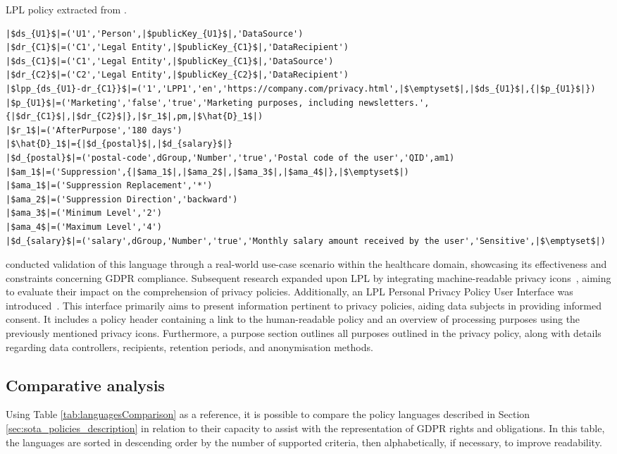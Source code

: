\begin{listing}[ht]
\caption{LPL policy extracted from \cite{gerl_lpl_2018}.}
\label{list:lpl_example}
\begin{verbatim}
|$ds_{U1}$|=('U1','Person',|$publicKey_{U1}$|,'DataSource')
|$dr_{C1}$|=('C1','Legal Entity',|$publicKey_{C1}$|,'DataRecipient')
|$ds_{C1}$|=('C1','Legal Entity',|$publicKey_{C1}$|,'DataSource')
|$dr_{C2}$|=('C2','Legal Entity',|$publicKey_{C2}$|,'DataRecipient')
|$lpp_{ds_{U1}-dr_{C1}}$|=('1','LPP1','en','https://company.com/privacy.html',|$\emptyset$|,|$ds_{U1}$|,{|$p_{U1}$|})
|$p_{U1}$|=('Marketing','false','true','Marketing purposes, including newsletters.',{|$dr_{C1}$|,|$dr_{C2}$|},|$r_1$|,pm,|$\hat{D}_1$|)
|$r_1$|=('AfterPurpose','180 days')
|$\hat{D}_1$|={|$d_{postal}$|,|$d_{salary}$|}
|$d_{postal}$|=('postal-code',dGroup,'Number','true','Postal code of the user','QID',am1)
|$am_1$|=('Suppression',{|$ama_1$|,|$ama_2$|,|$ama_3$|,|$ama_4$|},|$\emptyset$|)
|$ama_1$|=('Suppression Replacement','*')
|$ama_2$|=('Suppression Direction','backward')
|$ama_3$|=('Minimum Level','2')
|$ama_4$|=('Maximum Level','4')
|$d_{salary}$|=('salary',dGroup,'Number','true','Monthly salary amount received by the user','Sensitive',|$\emptyset$|)
\end{verbatim}
\end{listing}

\cite{gerl_privacy_2019} conducted validation of this language through a real-world use-case scenario within the healthcare domain, showcasing its effectiveness and constraints concerning GDPR compliance.
Subsequent research expanded upon LPL by integrating machine-readable privacy icons~\citep{gerl_extending_2018}, aiming to evaluate their impact on the comprehension of privacy policies.
Additionally, an LPL Personal Privacy Policy User Interface was introduced~\citep{gerl_interface_2018}.
This interface primarily aims to present information pertinent to privacy policies, aiding data subjects in providing informed consent.
It includes a policy header containing a link to the human-readable policy and an overview of processing purposes using the previously mentioned privacy icons.
Furthermore, a purpose section outlines all purposes outlined in the privacy policy, along with details regarding data controllers, recipients, retention periods, and anonymisation methods.

\subsection{Comparative analysis}
\label{sec:sota_policies_analysis}
Using Table \ref{tab:languagesComparison} as a reference, it is possible to compare the policy languages described in Section \ref{sec:sota_policies_description} in relation to their capacity to assist with the representation of GDPR rights and obligations.
In this table, the languages are sorted in descending order by the number of supported criteria, then alphabetically, if necessary, to improve readability.

